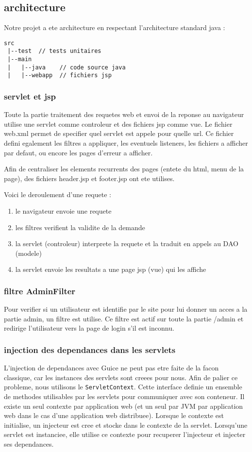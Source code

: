 \subsection{architecture}

Notre projet a ete architecture en respectant l'architecture standard java :
\begin{verbatim}
src
 |--test  // tests unitaires
 |--main
 |   |--java    // code source java
 |   |--webapp  // fichiers jsp
\end{verbatim}

\subsubsection{servlet et jsp}
Toute la partie traitement des requetes web et envoi de la reponse au navigateur utilise une servlet comme controleur et des fichiers jsp comme vue. Le fichier web.xml permet de specifier quel servlet est appele pour quelle url. Ce fichier defini egalement les filtres a appliquer, les eventuels listeners, les fichiers a afficher par defaut, ou encore les pages d'erreur a afficher.

Afin de centraliser les elements recurrents des pages (entete du html, menu de la page), des fichiers header.jsp et footer.jsp ont ete utilises.

Voici le deroulement d'une requete : 
\begin{enumerate}
	\item le navigateur envoie une requete
	\item les filtres verifient la validite de la demande
	\item la servlet (controleur) interprete la requete et la traduit en appels au DAO (modele)
	\item la servlet envoie les resultats a une page jsp (vue) qui les affiche
\end{enumerate}

\subsubsection{filtre AdminFilter}
Pour verifier si un utilisateur est identifie par le site pour lui donner un acces a la partie admin, un filtre est utilise. Ce filtre est actif sur toute la partie /admin et redirige l'utilisateur vers la page de login s'il est inconnu.

\subsubsection{injection des dependances dans les servlets}
L'injection de dependances avec Guice ne peut pas etre faite de la facon classique, car les instances des servlets sont creees pour nous. Afin de palier ce probleme, nous utilisons le \verb|ServletContext|. Cette  interface definie un ensemble de methodes utilisables par les servlets pour communiquer avec son conteneur. Il existe un seul contexte par application web (et un seul par JVM par application web dans le cas d'une application web distribuee). Lorsque le contexte est initialise, un injecteur est cree et stocke dans le contexte de la servlet. Lorsqu'une servlet est instanciee, elle utilise ce contexte pour recuperer l'injecteur et injecter ses dependances.

